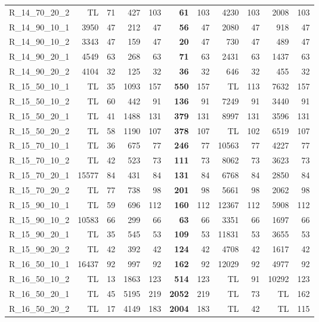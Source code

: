 \documentclass{article}
\begin{document}
\begin{longtable}{lrrrrrrrrrr}
R\_14\_70\_20\_2 & TL & 71 & 427 & 103 & \textbf{61} & 103 & 4230 & 103 & 2008 & 103 \\
R\_14\_90\_10\_1 & 3950 & 47 & 212 & 47 & \textbf{56} & 47 & 2080 & 47 & 918 & 47 \\
R\_14\_90\_10\_2 & 3343 & 47 & 159 & 47 & \textbf{20} & 47 & 730 & 47 & 489 & 47 \\
R\_14\_90\_20\_1 & 4549 & 63 & 268 & 63 & \textbf{71} & 63 & 2431 & 63 & 1437 & 63 \\
R\_14\_90\_20\_2 & 4104 & 32 & 125 & 32 & \textbf{36} & 32 & 646 & 32 & 455 & 32 \\
R\_15\_50\_10\_1 & TL & 35 & 1093 & 157 & \textbf{550} & 157 & TL & 113 & 7632 & 157 \\
R\_15\_50\_10\_2 & TL & 60 & 442 & 91 & \textbf{136} & 91 & 7249 & 91 & 3440 & 91 \\
R\_15\_50\_20\_1 & TL & 41 & 1488 & 131 & \textbf{379} & 131 & 8997 & 131 & 3596 & 131 \\
R\_15\_50\_20\_2 & TL & 58 & 1190 & 107 & \textbf{378} & 107 & TL & 102 & 6519 & 107 \\
R\_15\_70\_10\_1 & TL & 36 & 675 & 77 & \textbf{246} & 77 & 10563 & 77 & 4227 & 77 \\
R\_15\_70\_10\_2 & TL & 42 & 523 & 73 & \textbf{111} & 73 & 8062 & 73 & 3623 & 73 \\
R\_15\_70\_20\_1 & 15577 & 84 & 431 & 84 & \textbf{131} & 84 & 6768 & 84 & 2850 & 84 \\
R\_15\_70\_20\_2 & TL & 77 & 738 & 98 & \textbf{201} & 98 & 5661 & 98 & 2062 & 98 \\
R\_15\_90\_10\_1 & TL & 59 & 696 & 112 & \textbf{160} & 112 & 12367 & 112 & 5908 & 112 \\
R\_15\_90\_10\_2 & 10583 & 66 & 299 & 66 & \textbf{63} & 66 & 3351 & 66 & 1697 & 66 \\
R\_15\_90\_20\_1 & TL & 35 & 545 & 53 & \textbf{109} & 53 & 11831 & 53 & 3655 & 53 \\
R\_15\_90\_20\_2 & TL & 42 & 392 & 42 & \textbf{124} & 42 & 4708 & 42 & 1617 & 42 \\
R\_16\_50\_10\_1 & 16437 & 92 & 997 & 92 & \textbf{162} & 92 & 12029 & 92 & 4977 & 92 \\
R\_16\_50\_10\_2 & TL & 13 & 1863 & 123 & \textbf{514} & 123 & TL & 91 & 10292 & 123 \\
R\_16\_50\_20\_1 & TL & 45 & 5195 & 219 & \textbf{2052} & 219 & TL & 73 & TL & 162 \\
R\_16\_50\_20\_2 & TL & 17 & 4149 & 183 & \textbf{2004} & 183 & TL & 42 & TL & 115 \\

\end{longtable}
\end{document}
